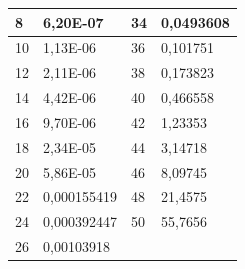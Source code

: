 \documentclass[11pt,openany]{book}
\begin{document}
\begin{figure}[H]
\begin{minipage}{0.5\textwidth}
\begin{tabular}{|l|l|l|l|}
            8               & 6,20E-07        & 34              & 0,0493608       \\ \hline
            10              & 1,13E-06        & 36              & 0,101751        \\ \hline
            12              & 2,11E-06        & 38              & 0,173823        \\ \hline
            14              & 4,42E-06        & 40              & 0,466558        \\ \hline
            16              & 9,70E-06        & 42              & 1,23353         \\ \hline
            18              & 2,34E-05        & 44              & 3,14718         \\ \hline
            20              & 5,86E-05        & 46              & 8,09745         \\ \hline
            22              & 0,000155419     & 48              & 21,4575         \\ \hline
            24              & 0,000392447     & 50              & 55,7656         \\ \hline
            26              & 0,00103918      & ~               &                 \\ \hline
        \end{tabular}
    \end{minipage}
\end{figure}
\end{document}
